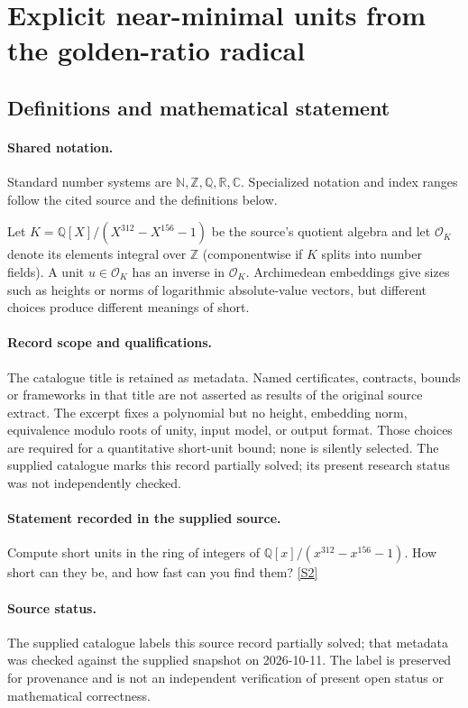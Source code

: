 \documentclass[11pt]{article}
\newcommand{\sref}[2]{\hyperlink{source:#1:#2}{[S#2]}}
\begin{document}
\section{Explicit near-minimal units from the golden-ratio radical}\label{statement}

\subsection{Definitions and mathematical statement}

\paragraph{Shared notation.}Standard number systems are $\mathbb N,\mathbb Z,\mathbb Q,\mathbb R,\mathbb C$. Specialized notation and index ranges follow the cited source and the definitions below.


Let $K=\mathbb Q[X]/(X^{312}-X^{156}-1)$ be the source's quotient algebra and let $\mathcal O_K$ denote its elements integral over $\mathbb Z$ (componentwise if $K$ splits into number fields). A unit $u\in\mathcal O_K$ has an inverse in $\mathcal O_K$. Archimedean embeddings give sizes such as heights or norms of logarithmic absolute-value vectors, but different choices produce different meanings of short.
\paragraph{Record scope and qualifications.}
The catalogue title is retained as metadata. Named certificates, contracts, bounds or frameworks in that title are not asserted as results of the original source extract.
The excerpt fixes a polynomial but no height, embedding norm, equivalence modulo roots of unity, input model, or output format. Those choices are required for a quantitative short-unit bound; none is silently selected. The supplied catalogue marks this record partially solved; its present research status was not independently checked.
\paragraph{Statement recorded in the supplied source.}
Compute short units in the ring of integers of $\mathbb Q[x]/(x^{312} - x^{156} -1)$. How short can they be, and how fast can you find them? \sref{statement}{2}
\paragraph{Source status.}
The supplied catalogue labels this source record partially solved; that metadata was checked against the supplied snapshot on 2026-10-11. The label is preserved for provenance and is not an independent verification of present open status or mathematical correctness.
\end{document}
